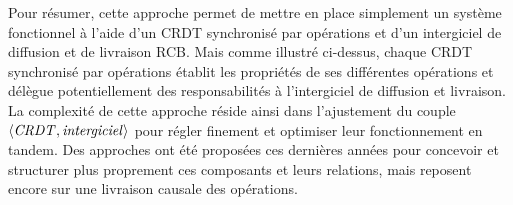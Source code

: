 Pour résumer, cette approche permet de mettre en place simplement un système fonctionnel à l'aide d'un \ac{CRDT} synchronisé par opérations et d'un intergiciel de diffusion et de livraison RCB.
Mais comme illustré ci-dessus, chaque \ac{CRDT} synchronisé par opérations établit les propriétés de ses différentes opérations et délègue potentiellement des responsabilités à l'intergiciel de diffusion et livraison.
La complexité de cette approche réside ainsi dans l'ajustement du couple $\langle \mathit{CRDT}, \mathit{intergiciel} \rangle$ pour régler finement et optimiser leur fonctionnement en tandem.
Des approches \cite{baquero2017pure, 2021-improving-reactivity-pure-op-based-crdts-bauwens} ont été proposées ces dernières années pour concevoir et structurer plus proprement ces composants et leurs relations, mais reposent encore sur une livraison causale des opérations.

